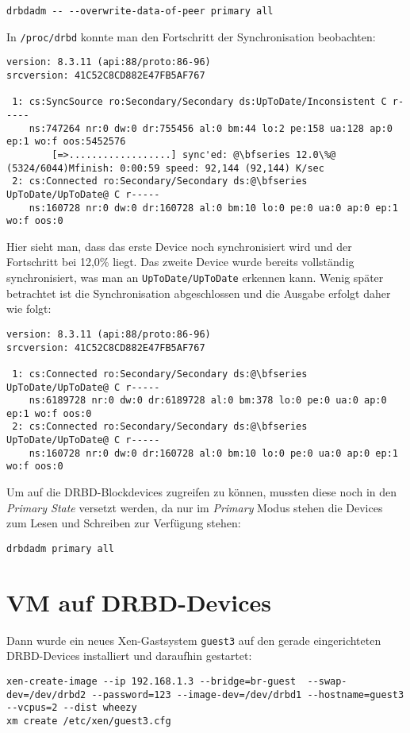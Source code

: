 \setupVerbatimOut
\begin{verbatim}
drbdadm -- --overwrite-data-of-peer primary all
\end{verbatim}
In \verb#/proc/drbd# konnte man den Fortschritt der Synchronisation beobachten:
\setupVerbatimOut
\begin{verbatim}
version: 8.3.11 (api:88/proto:86-96)
srcversion: 41C52C8CD882E47FB5AF767 

 1: cs:SyncSource ro:Secondary/Secondary ds:UpToDate/Inconsistent C r-----
    ns:747264 nr:0 dw:0 dr:755456 al:0 bm:44 lo:2 pe:158 ua:128 ap:0 ep:1 wo:f oos:5452576
        [=>..................] sync'ed: @\bfseries 12.0\%@ (5324/6044)Mfinish: 0:00:59 speed: 92,144 (92,144) K/sec
 2: cs:Connected ro:Secondary/Secondary ds:@\bfseries UpToDate/UpToDate@ C r-----
    ns:160728 nr:0 dw:0 dr:160728 al:0 bm:10 lo:0 pe:0 ua:0 ap:0 ep:1 wo:f oos:0
\end{verbatim}
Hier sieht man, dass das erste Device noch synchronisiert wird und der Fortschritt bei 12,0\% liegt. Das zweite Device wurde bereits vollständig synchronisiert, was man an \verb#UpToDate/UpToDate# erkennen kann.
Wenig später betrachtet ist die Synchronisation abgeschlossen und die Ausgabe erfolgt daher wie folgt:

\setupVerbatimOut
\begin{verbatim}
version: 8.3.11 (api:88/proto:86-96)
srcversion: 41C52C8CD882E47FB5AF767 

 1: cs:Connected ro:Secondary/Secondary ds:@\bfseries UpToDate/UpToDate@ C r-----
    ns:6189728 nr:0 dw:0 dr:6189728 al:0 bm:378 lo:0 pe:0 ua:0 ap:0 ep:1 wo:f oos:0
 2: cs:Connected ro:Secondary/Secondary ds:@\bfseries UpToDate/UpToDate@ C r-----
    ns:160728 nr:0 dw:0 dr:160728 al:0 bm:10 lo:0 pe:0 ua:0 ap:0 ep:1 wo:f oos:0
\end{verbatim}

Um auf die DRBD-Blockdevices zugreifen zu können, mussten diese noch in den \emph{Primary State} versetzt werden, da nur im \emph{Primary} Modus stehen die Devices zum Lesen und Schreiben zur Verfügung stehen:
\setupVerbatimOut
\begin{verbatim}
drbdadm primary all
\end{verbatim}

\section{VM auf DRBD-Devices}
Dann wurde ein neues Xen-Gastsystem \verb#guest3# auf den gerade eingerichteten DRBD-Devices installiert und daraufhin gestartet:
\setupVerbatimOut
\begin{verbatim}
xen-create-image --ip 192.168.1.3 --bridge=br-guest  --swap-dev=/dev/drbd2 --password=123 --image-dev=/dev/drbd1 --hostname=guest3 --vcpus=2 --dist wheezy
xm create /etc/xen/guest3.cfg
\end{verbatim}

